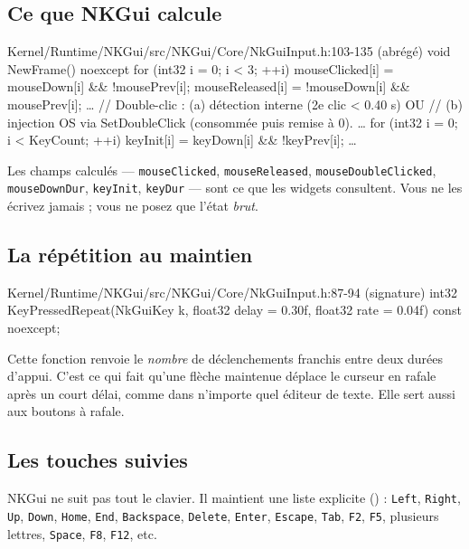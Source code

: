 \subsection{Ce que NKGui calcule}

\begin{nkcode}{Kernel/Runtime/NKGui/src/NKGui/Core/NkGuiInput.h:103-135 (abrégé)}
void NewFrame() noexcept {
    for (int32 i = 0; i < 3; ++i) {
        mouseClicked[i]  =  mouseDown[i] && !mousePrev[i];
        mouseReleased[i] = !mouseDown[i] &&  mousePrev[i];
        …
        // Double-clic : (a) détection interne (2e clic < 0.40 s) OU
        // (b) injection OS via SetDoubleClick (consommée puis remise à 0).
        …
    }
    for (int32 i = 0; i < KeyCount; ++i) {
        keyInit[i] = keyDown[i] && !keyPrev[i];
        …
    }
}
\end{nkcode}

Les champs calculés — \texttt{mouseClicked}, \texttt{mouseReleased},
\texttt{mouseDoubleClicked}, \texttt{mouseDownDur}, \texttt{keyInit},
\texttt{keyDur} — sont ce que les widgets consultent. Vous ne les écrivez
jamais ; vous ne posez que l'état \emph{brut}.

\subsection{La répétition au maintien}

\begin{nkcode}{Kernel/Runtime/NKGui/src/NKGui/Core/NkGuiInput.h:87-94 (signature)}
int32 KeyPressedRepeat(NkGuiKey k, float32 delay = 0.30f, float32 rate = 0.04f) const noexcept;
\end{nkcode}

Cette fonction renvoie le \emph{nombre} de déclenchements franchis entre deux
durées d'appui. C'est ce qui fait qu'une flèche maintenue déplace le curseur en
rafale après un court délai, comme dans n'importe quel éditeur de texte. Elle
sert aussi aux boutons à rafale.

\subsection{Les touches suivies}

NKGui ne suit pas tout le clavier. Il maintient une liste explicite
() : \texttt{Left}, \texttt{Right}, \texttt{Up},
\texttt{Down}, \texttt{Home}, \texttt{End}, \texttt{Backspace},
\texttt{Delete}, \texttt{Enter}, \texttt{Escape}, \texttt{Tab}, \texttt{F2},
\texttt{F5}, plusieurs lettres, \texttt{Space}, \texttt{F8}, \texttt{F12},
etc.

